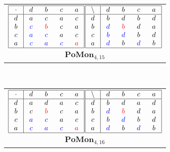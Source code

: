 \documentclass{amsart}
\newcommand{\g}{\textcolor{blue}}
\newcommand{\rd}{\textcolor{red}}
\newcommand{\W}[1]{\makebox[12pt]{$#1$}}%
\begin{document}
\ 
\begin{tabular}[b]{c}
$\begin{array}{|c|cccc|}\hline
\W{\cdot}&\W{d}&\W{b}&\W{c}&\W{a}\\\hline
d&a&c&a&c\\
b&\g{c}&\rd{b}&c&a\\
c&\g{a}&\g{c}&a&c\\
a&\g{c}&\g{a}&\g{c}&\rd{a}\\
\hline
\end{array}$$\begin{array}{|c|cccc|}\hline
\W{\backslash}&\W{d}&\W{b}&\W{c}&\W{a}\\\hline
d&b&d&b&d\\
b&\g{d}&\rd{b}&d&a\\
c&\g{b}&\g{d}&b&d\\
a&\g{d}&b&\g{d}&b\\
\hline
\end{array}$\\
$\mathbf{PoMon}_{4,15}$
\end{tabular}
\ 
\begin{tabular}[b]{c}
$\begin{array}{|c|cccc|}\hline
\W{\cdot}&\W{d}&\W{b}&\W{c}&\W{a}\\\hline
d&a&d&a&c\\
b&c&\rd{b}&c&a\\
c&\g{a}&\g{c}&a&c\\
a&\g{c}&\g{a}&\g{c}&\rd{a}\\
\hline
\end{array}$$\begin{array}{|c|cccc|}\hline
\W{\backslash}&\W{d}&\W{b}&\W{c}&\W{a}\\\hline
d&b&d&a&d\\
b&\g{d}&\rd{b}&d&a\\
c&b&\g{d}&b&d\\
a&\g{d}&b&\g{d}&b\\
\hline
\end{array}$\\
$\mathbf{PoMon}_{4,16}$
\end{tabular}
\end{document}
